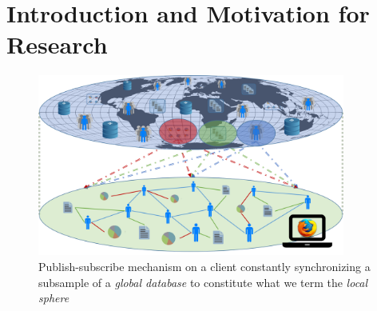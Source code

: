 \documentclass{llncs}
\begin{document}
\renewcommand{\thesubfigure}{\thefigure.\arabic{subfigure}}
\makeatletter
\renewcommand{\p@subfigure}{}
\renewcommand{\@thesubfigure}{\thesubfigure:\hskip\subfiglabelskip}
\makeatother


\section{Introduction and Motivation for Research}
\label{sect:intro_motivation}

\begin{figure}[H]
	\begin{center}
		\includegraphics[width=0.9\textwidth]{figures/local_sphere}
		\caption{Publish-subscribe mechanism on a client constantly synchronizing a subsample of a \textit{global database} to constitute what we term the \textit{local sphere}}
		\label{fig:anon_categories}
	\end{center}
\end{figure}




\cite{leskovec2006recpatterns}
\cite{leskovec2006samplinggraphs}
\cite{leskovec2007blogpatterns}

\cite{mcmahan2016communication}
\cite{konevcny2016federatedlearning}
\cite{konevcny2016federatedoptimization}
\cite{2017secureaggregation}

\cite{shi2012climf}


\newpage



\end{document}
